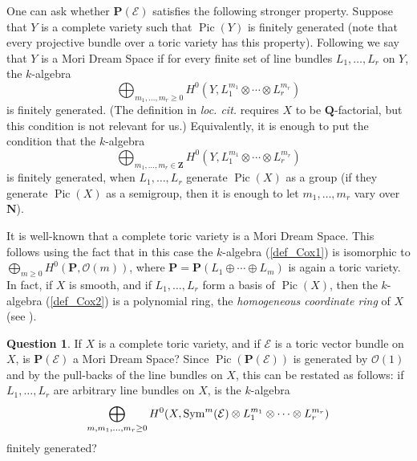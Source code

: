\documentclass[12pt]{amsart}
\theoremstyle{definition}
\newtheorem{question}[lemma]{Question}
\theoremstyle{remark}
\begin{document}
One can ask whether  ${{\mathbf P}}({\mathcal{E}})$ satisfies the following stronger property.
Suppose that $Y$ is a complete variety such that $\operatorname{Pic}(Y)$ is finitely generated 
(note that every projective bundle over a toric variety has this property). Following 
\cite{HK} we say that $Y$ is a Mori Dream
Space if for every finite set of line bundles
$L_1,\ldots,L_r$ on $Y$, the $k$-algebra
\begin{equation}\label{def_Cox1}
\bigoplus_{m_1,\ldots,m_r\geq 0}H^0(Y, L_1^{m_1}\otimes\cdots\otimes
L_r^{m_r})
\end{equation} 
is finitely generated. 
(The definition in \emph{loc. cit.}
 requires $X$ to be ${{\mathbf Q}}$-factorial, but this condition is not relevant for us.)
 Equivalently, it is enough to put the condition that the $k$-algebra
 \begin{equation}\label{def_Cox2}
\bigoplus_{m_1,\ldots,m_r\in{{\mathbf Z}}}H^0(Y,L_1^{m_1}\otimes\cdots\otimes
L_r^{m_r})
\end{equation} 
is finitely generated, when $L_1,\ldots,L_r$ generate $\operatorname{Pic}(X)$ as a group
(if they generate $\operatorname{Pic}(X)$ as a semigroup, then it is enough to let $m_1,\ldots,m_r$
vary over ${{\mathbf N}}$).

It is well-known that a complete toric variety is a Mori Dream Space. This follows using the fact
that in this case the $k$-algebra (\ref{def_Cox1}) is isomorphic to
$\bigoplus_{m\geq 0} H^0({{\mathbf P}},{\mathcal{O}}(m))$, where ${{\mathbf P}}={{\mathbf P}}(L_1\oplus\cdots\oplus L_m)$
is again a toric variety. In fact, if $X$ is smooth, and if $L_1,\ldots,L_r$ form a basis of
$\operatorname{Pic}(X)$, then the $k$-algebra (\ref{def_Cox2}) is a polynomial ring, the 
\emph{homogeneous coordinate ring} of $X$
(see \cite{Cox}).

\begin{question}\label{q4}
If $X$ is a complete toric variety, and if ${\mathcal{E}}$ is a
toric vector bundle on $X$, is ${{\mathbf P}}({\mathcal{E}})$ a Mori Dream Space?
Since $\operatorname{Pic}({{\mathbf P}}({\mathcal{E}}))$ is generated by ${\mathcal{O}}(1)$ and by the pull-backs of the line bundles 
on $X$, this can be restated as follows: if
$L_1,\ldots,L_r$ are arbitrary line bundles on $X$, is the 
$k$-algebra
\begin{equation}\label{MDS}
\bigoplus_{m,m_1,\ldots,m_r\geq 0}H^0(X,{\rm Sym}^m({\mathcal{E}})\otimes
L_1^{m_1}\otimes\cdots\otimes L_r^{m_r})
\end{equation}
 finitely generated?
 \end{question}
 
\end{document}

